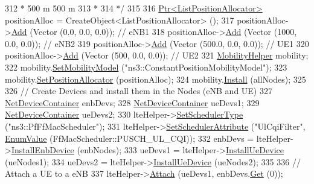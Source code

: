 \begin{DoxyCode}
312 \textcolor{comment}{   *                  500 m                       500 m}
313 \textcolor{comment}{   *}
314 \textcolor{comment}{   */}
315 
316   \hyperlink{classns3_1_1Ptr}{Ptr<ListPositionAllocator>} positionAlloc = CreateObject<ListPositionAllocator> 
      ();
317   positionAlloc->\hyperlink{classns3_1_1ListPositionAllocator_a460e82f015ac012a73ba0ea0cccb3486}{Add} (Vector (0.0, 0.0, 0.0));   \textcolor{comment}{// eNB1}
318   positionAlloc->\hyperlink{classns3_1_1ListPositionAllocator_a460e82f015ac012a73ba0ea0cccb3486}{Add} (Vector (1000, 0.0, 0.0)); \textcolor{comment}{// eNB2}
319   positionAlloc->\hyperlink{classns3_1_1ListPositionAllocator_a460e82f015ac012a73ba0ea0cccb3486}{Add} (Vector (500.0, 0.0, 0.0));  \textcolor{comment}{// UE1}
320   positionAlloc->\hyperlink{classns3_1_1ListPositionAllocator_a460e82f015ac012a73ba0ea0cccb3486}{Add} (Vector (500, 0.0, 0.0));  \textcolor{comment}{// UE2}
321   \hyperlink{classns3_1_1MobilityHelper}{MobilityHelper} mobility;
322   mobility.\hyperlink{classns3_1_1MobilityHelper_a030275011b6f40682e70534d30280aba}{SetMobilityModel} (\textcolor{stringliteral}{"ns3::ConstantPositionMobilityModel"});
323   mobility.\hyperlink{classns3_1_1MobilityHelper_ac59d5295076be3cc11021566713a28c5}{SetPositionAllocator} (positionAlloc);
324   mobility.\hyperlink{classns3_1_1MobilityHelper_a07737960ee95c0777109cf2994dd97ae}{Install} (allNodes);
325 
326   \textcolor{comment}{// Create Devices and install them in the Nodes (eNB and UE)}
327   \hyperlink{classns3_1_1NetDeviceContainer}{NetDeviceContainer} enbDevs;
328   \hyperlink{classns3_1_1NetDeviceContainer}{NetDeviceContainer} ueDevs1;
329   \hyperlink{classns3_1_1NetDeviceContainer}{NetDeviceContainer} ueDevs2;
330   lteHelper->\hyperlink{classns3_1_1LteHelper_a8f86e55b8b80a81732c4b2df00fb25d5}{SetSchedulerType} (\textcolor{stringliteral}{"ns3::PfFfMacScheduler"});
331   lteHelper->\hyperlink{classns3_1_1LteHelper_a38f8c7f4592b31c0f3dedb53e7909742}{SetSchedulerAttribute} (\textcolor{stringliteral}{"UlCqiFilter"}, 
      \hyperlink{classns3_1_1EnumValue}{EnumValue} (FfMacScheduler::PUSCH\_UL\_CQI));
332   enbDevs = lteHelper->\hyperlink{classns3_1_1LteHelper_a5e009ad35ef85f46b5a6099263f15a03}{InstallEnbDevice} (enbNodes);
333   ueDevs1 = lteHelper->\hyperlink{classns3_1_1LteHelper_ac9cd932d7de92811cfa953c2e3b2fc9f}{InstallUeDevice} (ueNodes1);
334   ueDevs2 = lteHelper->\hyperlink{classns3_1_1LteHelper_ac9cd932d7de92811cfa953c2e3b2fc9f}{InstallUeDevice} (ueNodes2);
335 
336   \textcolor{comment}{// Attach a UE to a eNB}
337   lteHelper->\hyperlink{classns3_1_1LteHelper_a9466743f826aa2652a87907b7f0a1c87}{Attach} (ueDevs1, enbDevs.\hyperlink{classns3_1_1NetDeviceContainer_a677d62594b5c9d2dea155cc5045f4d0b}{Get} (0));

\end{DoxyCode}
